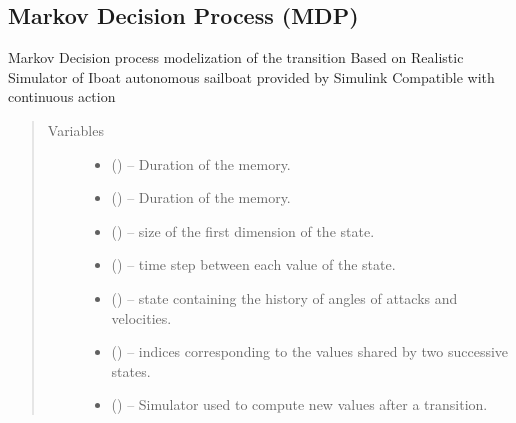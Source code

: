 \documentclass[letterpaper,10pt,english]{sphinxmanual}
\begin{document}
\subsection{Markov Decision Process (MDP)}
\label{\detokenize{package1:markov-decision-process-mdp}}\label{\detokenize{package1:module-mdp}}

\begin{fulllineitems}
\label{\detokenize{package1:mdp.ContinuousMDP}}
Markov Decision process modelization of the transition
Based on Realistic Simulator of Iboat autonomous sailboat provided by Simulink
Compatible with continuous action
\begin{quote}\begin{description}
\item[{Variables}] \leavevmode\begin{itemize}
\item {} 
 () -- Duration of the memory.

\item {} 
 () -- Duration of the memory.

\item {} 
 () -- size of the first dimension of the state.

\item {} 
 () -- time step between each value of the state.

\item {} 
 (\sphinxstyleliteralemphasis{(}\sphinxstyleliteralemphasis{)}) -- state containing the history of angles of attacks and velocities.

\item {} 
 () -- indices corresponding to the values shared by two successive states.

\item {} 
 ({\hyperref[\detokenize{package1:module-Simulator}]{}}) -- Simulator used to compute new values after a transition.


\end{itemize}
\end{description}
\end{quote}
\end{fulllineitems}
\end{document}

